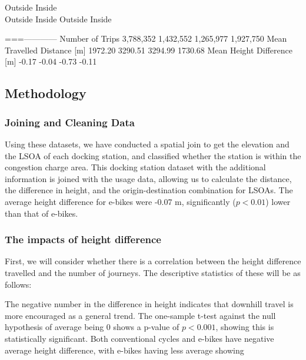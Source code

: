 \documentclass[
  letterpaper,
  DIV=11,
  numbers=noendperiod]{scrartcl}
\begin{document}
\textbar{} Outside \textbar\textbar{} Inside \textbar\textbar{}\\
\textbar{} Outside \textbar{} Inside \textbar{} Outside \textbar{}
Inside \textbar{}

\textbar===\textbar---\textbar---\textbar---\textbar---\textbar{}
\textbar{} Number of Trips \textbar{} 3,788,352 \textbar{} 1,432,552
\textbar{} 1,265,977 \textbar{} 1,927,750 \textbar{} \textbar{} Mean
Travelled Distance {[}m{]} \textbar{} 1972.20 \textbar{} 3290.51
\textbar{} 3294.99 \textbar{} 1730.68 \textbar{} \textbar{} Mean Height
Difference {[}m{]} \textbar{} -0.17 \textbar{} -0.04 \textbar{} -0.73
\textbar{} -0.11 \textbar{}

\hypertarget{methodology}{%
\subsection{Methodology}\label{methodology}}

\hypertarget{joining-and-cleaning-data}{%
\subsubsection{Joining and Cleaning
Data}\label{joining-and-cleaning-data}}

Using these datasets, we have conducted a spatial join to get the
elevation and the LSOA of each docking station, and classified whether
the station is within the congestion charge area. This docking station
dataset with the additional information is joined with the usage data,
allowing us to calculate the distance, the difference in height, and the
origin-destination combination for LSOAs. The average height difference
for e-bikes were -0.07 m, significantly (\(p < 0.01\)) lower than that
of e-bikes.

\hypertarget{the-impacts-of-height-difference}{%
\subsubsection{The impacts of height
difference}\label{the-impacts-of-height-difference}}

First, we will consider whether there is a correlation between the
height difference travelled and the number of journeys. The descriptive
statistics of these will be as follows:

The negative number in the difference in height indicates that downhill
travel is more encouraged as a general trend. The one-sample t-test
against the null hypothesis of average being 0 shows a p-value of
\(p < 0.001\), showing this is statistically significant. Both
conventional cycles and e-bikes have negative average height difference,
with e-bikes having less average showing
\end{document}
